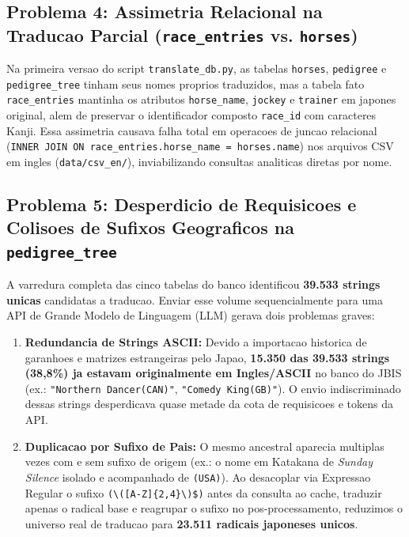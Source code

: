 \documentclass[12pt,a4paper]{article}
\begin{document}
\subsection{Problema 4: Assimetria Relacional na Traducao Parcial (\texttt{race\_entries} vs. \texttt{horses})}
Na primeira versao do script \texttt{translate\_db.py}, as tabelas \texttt{horses}, \texttt{pedigree} e \texttt{pedigree\_tree} tinham seus nomes proprios traduzidos, mas a tabela fato \texttt{race\_entries} mantinha os atributos \texttt{horse\_name}, \texttt{jockey} e \texttt{trainer} em japones original, alem de preservar o identificador composto \texttt{race\_id} com caracteres Kanji.
Essa assimetria causava falha total em operacoes de juncao relacional (\texttt{INNER JOIN ON race\_entries.horse\_name = horses.name}) nos arquivos CSV em ingles (\texttt{data/csv\_en/}), inviabilizando consultas analiticas diretas por nome.

\subsection{Problema 5: Desperdicio de Requisicoes e Colisoes de Sufixos Geograficos na \texttt{pedigree\_tree}}
A varredura completa das cinco tabelas do banco identificou \textbf{39.533 strings unicas} candidatas a traducao. Enviar esse volume sequencialmente para uma API de Grande Modelo de Linguagem (LLM) gerava dois problemas graves:
\begin{enumerate}
    \item \textbf{Redundancia de Strings ASCII:} Devido a importacao historica de garanhoes e matrizes estrangeiras pelo Japao, \textbf{15.350 das 39.533 strings (38,8\%) ja estavam originalmente em Ingles/ASCII} no banco do JBIS (ex.: \texttt{"Northern Dancer(CAN)"}, \texttt{"Comedy King(GB)"}). O envio indiscriminado dessas strings desperdicava quase metade da cota de requisicoes e tokens da API.
    \item \textbf{Duplicacao por Sufixo de Pais:} O mesmo ancestral aparecia multiplas vezes com e sem sufixo de origem (ex.: o nome em Katakana de \textit{Sunday Silence} isolado e acompanhado de \texttt{(USA)}). Ao desacoplar via Expressao Regular o sufixo \texttt{(\textbackslash([A-Z]\{2,4\}\textbackslash)\$)} antes da consulta ao cache, traduzir apenas o radical base e reagrupar o sufixo no pos-processamento, reduzimos o universo real de traducao para \textbf{23.511 radicais japoneses unicos}.
\end{enumerate}
\end{document}
